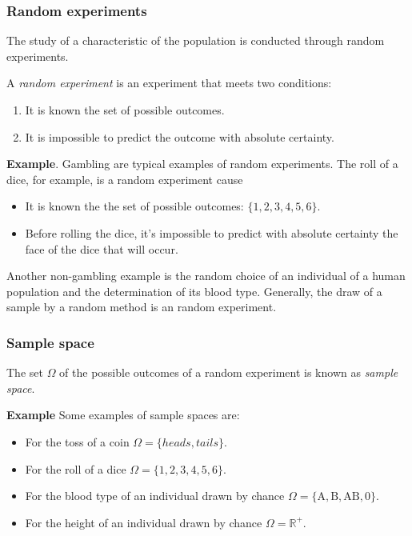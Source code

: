 \begin{frame}
\frametitle{Random experiments}
The study of a characteristic of the population is conducted through random experiments. 

\begin{definition} A \emph{random experiment} is an experiment that meets two conditions:
\begin{enumerate}
\item It is known the set of possible outcomes. 
\item It is impossible to predict the outcome with absolute certainty.
\end{enumerate} 
\end{definition}

\textbf{Example}. Gambling are typical examples of random experiments. 
The roll of a dice, for example, is a random experiment cause
\begin{itemize}
\item It is known the the set of possible outcomes: $\{1,2,3,4,5,6\}$.
\item Before rolling the dice, it's impossible to predict with absolute certainty the face of the dice that will occur. 
\end{itemize}

Another non-gambling example is the random choice of an individual of a human population and the determination of its
blood type. 
Generally, the draw of a sample by a random method  is an random experiment.
\end{frame}


\begin{frame}
\frametitle{Sample space}
\begin{definition}
The set $\Omega$ of the possible outcomes of a random experiment is known as \emph{sample space}.
\end{definition}

\textbf{Example} Some examples of sample spaces are:
\begin{itemize}
\item For the toss of a coin $\Omega=\{heads,tails\}$.
\item For the roll of a dice $\Omega=\{1,2,3,4,5,6\}$.
\item For the blood type of an individual drawn by chance $\Omega=\{\mbox{A},\mbox{B},\mbox{AB},\mbox{0}\}$.
\item For the height of an individual drawn by chance $\Omega=\mathbb{R}^+$.
\end{itemize}
\end{frame}


